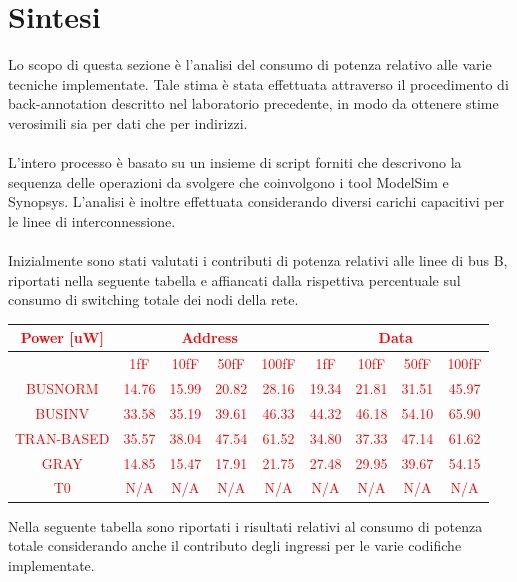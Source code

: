 \documentclass[11pt,  english, makeidx, a4paper, titlepage, oneside]{book}
\begin{document}
\section{Sintesi}
Lo scopo di questa sezione è l'analisi del consumo di potenza relativo alle varie tecniche implementate. Tale stima è stata effettuata attraverso il procedimento di back-annotation descritto nel laboratorio precedente, in modo da ottenere stime verosimili sia per dati che per indirizzi.
\\\\
L'intero processo è basato su un insieme di script forniti che descrivono la sequenza delle operazioni da svolgere che coinvolgono i tool ModelSim e Synopsys. L'analisi è inoltre effettuata considerando diversi carichi capacitivi per le linee di interconnessione.
\\\\
Inizialmente sono stati valutati i contributi di potenza relativi alle linee di bus B, riportati nella seguente tabella e affiancati dalla rispettiva percentuale sul consumo di switching totale dei nodi della rete.
\textcolor{red}{\begin{center}
	\begin{tabular}{|c|c|c|c|c|c|c|c|c|}
	\hline
	Power [uW] & \multicolumn{4}{c}{Address} & \multicolumn{4}{c}{Data}\\
	\hline
	 & 1fF & 10fF & 50fF & 100fF & 1fF & 10fF & 50fF & 100fF \\
	\hline
	BUSNORM & 14.76 & 15.99 & 20.82 & 28.16 & 19.34 & 21.81 & 31.51 & 45.97 \\
	 \hline
	BUSINV & 33.58 & 35.19 & 39.61 & 46.33 & 44.32 & 46.18 & 54.10 & 65.90 \\
	\hline
	TRAN-BASED & 35.57 & 38.04 & 47.54 & 61.52 & 34.80 & 37.33 & 47.14 & 61.62 \\
	\hline
	GRAY & 14.85 & 15.47 & 17.91 & 21.75 & 27.48 & 29.95 & 39.67 & 54.15 \\
	\hline
	T0 & N/A & N/A & N/A & N/A & N/A & N/A & N/A & N/A \\
	\hline
	\end{tabular}	
\end{center}
\vspace{0.3cm}}
Nella seguente tabella sono riportati i risultati relativi al consumo di potenza totale considerando anche il contributo degli ingressi per le varie codifiche implementate.
\\\\
\end{document}
